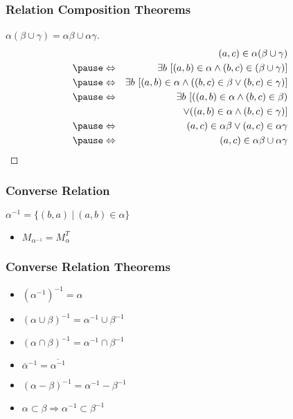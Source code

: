 \documentclass[dvipsnames]{beamer}
\begin{document}
\begin{frame}
  \frametitle{Relation Composition Theorems}

  \begin{proof}[$\alpha (\beta \cup \gamma) = \alpha \beta \cup \alpha \gamma$]
    \pause
    \begin{eqnarray*}
      &                 & (a,c) \in \alpha (\beta \cup \gamma)\\\pause
      & \Leftrightarrow & \exists b~[(a,b) \in \alpha
                              \wedge (b,c) \in (\beta \cup \gamma)]\\\pause
      & \Leftrightarrow & \exists b~[(a,b) \in \alpha
                             \wedge ((b,c) \in \beta
                                \vee (b,c) \in \gamma)]\\\pause
      & \Leftrightarrow & \exists b~[((a,b) \in \alpha \wedge (b,c) \in \beta)\\
      &                 &     ~~\vee ((a,b) \in \alpha \wedge (b,c) \in \gamma)]\\\pause
      & \Leftrightarrow & (a,c) \in \alpha \beta \vee (a,c) \in \alpha \gamma\\\pause
      & \Leftrightarrow & (a,c) \in \alpha \beta \cup \alpha \gamma
    \end{eqnarray*}
  \end{proof}
\end{frame}

\begin{frame}
  \frametitle{Converse Relation}

  \begin{definition}
    $\alpha^{-1} = \{(b,a)~|~(a,b) \in \alpha \}$
  \end{definition}

  \begin{itemize}
    \item $M_{\alpha^{-1}} = M_{\alpha}^T$
  \end{itemize}
\end{frame}

\begin{frame}
  \frametitle{Converse Relation Theorems}

  \begin{itemize}
    \item $(\alpha^{-1})^{-1} = \alpha$
    \item $(\alpha \cup \beta)^{-1} = \alpha^{-1} \cup \beta^{-1}$
    \item $(\alpha \cap \beta)^{-1} = \alpha^{-1} \cap \beta^{-1}$
    \item $\overline{\alpha}^{-1} = \overline{\alpha^{-1}}$
    \item $(\alpha - \beta)^{-1} = \alpha^{-1} - \beta^{-1}$
    \item $\alpha \subset \beta \Rightarrow \alpha^{-1} \subset \beta^{-1}$
  \end{itemize}
\end{frame}
\end{document}
